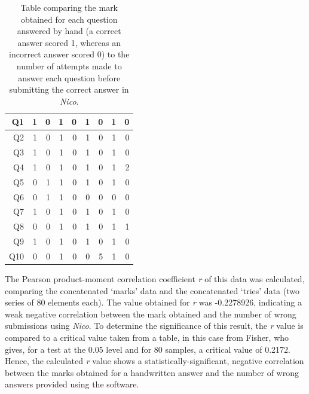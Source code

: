 \documentclass[12pt,twoside,notitlepage,xetex]{report}
\begin{document}
\begin{center}
\begin{table}[H]
\begin{center}
\begin{tabular}{|r||r|r||r|r||r|r||r|r|}
Q1 & 1 & 0 & 1 & 0 & 1 & 0 & 1 & 0\\ \hline
Q2 & 1 & 0 & 1 & 0 & 1 & 0 & 1 & 0\\ \hline
Q3 & 1 & 0 & 1 & 0 & 1 & 0 & 1 & 0\\ \hline
Q4 & 1 & 0 & 1 & 0 & 1 & 0 & 1 & 2\\ \hline
Q5 & 0 & 1 & 1 & 0 & 1 & 0 & 1 & 0\\ \hline
Q6 & 0 & 1 & 1 & 0 & 0 & 0 & 0 & 0\\ \hline
Q7 & 1 & 0 & 1 & 0 & 1 & 0 & 1 & 0\\ \hline
Q8 & 0 & 0 & 1 & 0 & 1 & 0 & 1 & 1\\ \hline
Q9 & 1 & 0 & 1 & 0 & 1 & 0 & 1 & 0\\ \hline
Q10 & 0 & 0 & 1 & 0 & 0 & 5 & 1 & 0\\
\hline
\end{tabular}
\end{center}
\caption{Table comparing the mark obtained for each question answered by hand (a correct answer scored 1, whereas an incorrect answer scored 0) to the number of attempts made to answer each question before submitting the correct answer in \emph{Nico}.}
\label{tab:MarksTries}
\end{table}
\end{center}

The Pearson product-moment correlation coefficient \emph{r} of this data was calculated, comparing the concatenated `marks' data and the concatenated `tries' data (two series of 80 elements each).  The value obtained for \emph{r} was -0.2278926, indicating a weak negative correlation between the mark obtained and the number of wrong submissions using \emph{Nico}.  To determine the significance of this result, the \emph{r} value is compared to a critical value taken from a table, in this case from Fisher, who gives, for a test at the 0.05 level and for 80 samples, a critical value of 0.2172. \cite{Fisher1990}  Hence, the calculated \emph{r} value shows a statistically-significant, negative correlation between the marks obtained for a handwritten answer and the number of wrong answers provided using the software.
\end{document}
